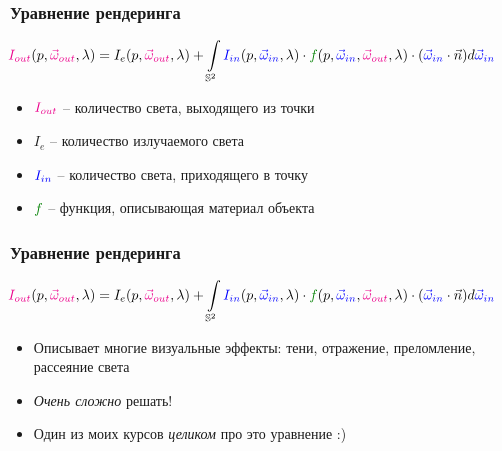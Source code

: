 \documentclass[10pt]{beamer}
\begin{document}
\begin{frame}
\frametitle{Уравнение рендеринга}
\begin{equation*}
\hspace*{-0.5cm}
{\color{magenta}I_{out}}(p, {\color{magenta}\vec\omega_{out}}, \lambda) = I_{e}(p, {\color{magenta}\vec\omega_{out}}, \lambda)+\int\limits_{\mathbb S^2} {\color{blue}I_{in}}(p, {\color{blue}\vec\omega_{in}}, \lambda) \cdot {\color{green}f}(p, {\color{blue}\vec\omega_{in}}, {\color{magenta}\vec\omega_{out}}, \lambda) \cdot ({\color{blue}\vec\omega_{in}} \cdot \vec{n}) d{\color{blue}\vec\omega_{in}}
\end{equation*}
\hspace*{-0.5cm}
\pause
\begin{itemize}
\item \begin{math}{\color{magenta}I_{out}}\end{math} -- количество света, выходящего из точки
\pause
\item \begin{math}I_{e}\end{math} -- количество излучаемого света 
\pause
\item \begin{math}{\color{blue}I_{in}}\end{math} -- количество света, приходящего в точку 
\pause
\item \begin{math}{\color{green}f}\end{math} -- функция, описывающая материал объекта
\end{itemize}
\end{frame}

\begin{frame}
\frametitle{Уравнение рендеринга}
\begin{equation*}
\hspace*{-0.5cm}
{\color{magenta}I_{out}}(p, {\color{magenta}\vec\omega_{out}}, \lambda) = I_{e}(p, {\color{magenta}\vec\omega_{out}}, \lambda)+\int\limits_{\mathbb S^2} {\color{blue}I_{in}}(p, {\color{blue}\vec\omega_{in}}, \lambda) \cdot {\color{green}f}(p, {\color{blue}\vec\omega_{in}}, {\color{magenta}\vec\omega_{out}}, \lambda) \cdot ({\color{blue}\vec\omega_{in}} \cdot \vec{n}) d{\color{blue}\vec\omega_{in}}
\end{equation*}
\hspace*{-0.5cm}
\pause
\begin{itemize}
\item Описывает многие визуальные эффекты: тени, отражение, преломление, рассеяние света
\pause
\item \textit{Очень сложно} решать!
\pause
\item Один из моих курсов \textit{целиком} про это уравнение :)
\end{itemize}
\end{frame}
\end{document}
